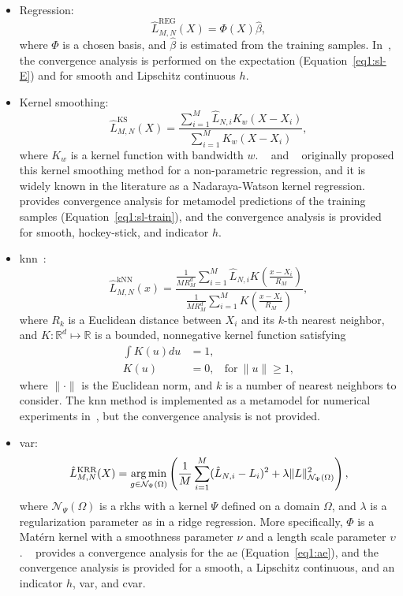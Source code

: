 \begin{itemize}
    \item   Regression:
            $$\hat{L}^{\text{REG}}_{M, N}(X) = \Phi(X) \hat{\beta},$$
            where $\Phi$ is a chosen basis, and $\hat{\beta}$ is estimated from the training samples.
            In~\cite{broadie2015risk}, the convergence analysis is performed on the expectation (Equation~\eqref{eq1:sl-E}) and for smooth and Lipschitz continuous $h$. 
    \item   Kernel smoothing:
            $$\hat{L}^{\text{KS}}_{M, N}(X) = \frac{\sum_{i=1}^M \hat{L}_{N, i} K_w(X - X_i)}{\sum_{i=1}^M K_w(X - X_i)}, $$
            where $K_w$ is a kernel function with bandwidth $w$.
            ~\cite{nadaraya1964estimating} and ~\cite{watson1964smooth} originally proposed this kernel smoothing method for a non-parametric regression, and it is widely known in the literature as a Nadaraya-Watson kernel regression.
            ~\cite{hong2017kernel} provides convergence analysis for metamodel predictions of the training samples (Equation~\eqref{eq1:sl-train}), and the convergence analysis is provided for smooth, hockey-stick, and indicator $h$. 

    \item   \gls{knn}~\citep{mack1981local}:
            \begin{equation*}
            \hat{L}^{\text{kNN}}_{M, N}(x) 
            = \frac{\frac{1}{M R_M^d} \sum_{i=1}^M \hat{L}_{N, i} K\left(\frac{x - X_i}{R_M}\right)}{\frac{1}{M R_M^d} \sum_{i=1}^M K\left(\frac{x - X_i}{R_M}\right)},
            \end{equation*}
            where $R_k$ is a Euclidean distance between $X_i$ and its $k$-th nearest neighbor, and $K:\mathbb{R}^d \mapsto \mathbb{R}$ is a bounded, nonnegative kernel function satisfying 
            \begin{align*}
                \int K(u) du & = 1, \\
                K(u) &= 0, ~~~ ~\text{for}~ \|u\| \geq 1,
            \end{align*}
            where $\|\cdot\|$ is the Euclidean norm, and  $k$ is a number of nearest neighbors to consider.
            The \gls{knn} method is implemented as a metamodel for numerical experiments in~\cite{hong2017kernel}, but the convergence analysis is not provided.

    \item   \gls{var}:
            $$\hat{L}^{\text{KRR}}_{M, N}(X) = \operatorname*{arg\,min}_{g \in \mathcal{N}_{\Psi}(\Omega)} \left( \frac{1}{M} \sum_{i=1}^M (\hat{L}_{N, i} - L_i)^2 + \lambda \|L\|_{\mathcal{N}_{\Psi}(\Omega)}^2\right),$$
            where $\mathcal{N}_{\Psi}(\Omega)$ is a \gls{rkhs} with a kernel $\Psi$ defined on a domain $\Omega$, and $\lambda$ is a regularization parameter as in a ridge regression. 
            More specifically, $\Phi$ is a Mat\'ern kernel with a smoothness parameter $\nu$ and a length scale parameter $\upsilon$.
            ~\cite{wang2022smooth} provides a convergence analysis for the \gls{ae} (Equation~\eqref{eq1:ae}), and the convergence analysis is provided for a smooth, a Lipschitz continuous, and an indicator $h$, \gls{var}, and \gls{cvar}.
\end{itemize}

